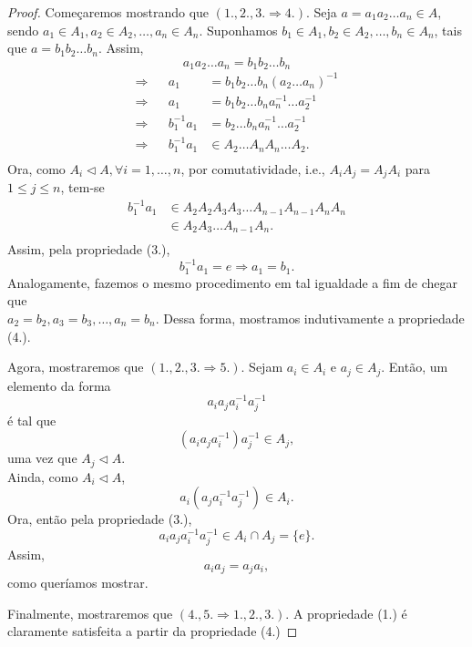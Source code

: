 \documentclass[11pt,openany]{book}
\begin{document}
\begin{proof}
    Começaremos mostrando que $(1., 2., 3. \Rightarrow 4.)$. Seja $a = a_1a_2\dots a_n \in A$, sendo $a_1 \in A_1, a_2 \in A_2, \dots, a_n \in A_n$. Suponhamos $b_1 \in A_1, b_2 \in A_2, \dots, b_n \in A_n$, tais que $a = b_1b_2\dots b_n$. Assim,
    \[a_1a_2\dots a_n = b_1b_2\dots b_n\]
    \begin{align*}
        \Rightarrow& & a_1 &= b_1b_2\dots b_n(a_2\dots a_n)^{-1}\\
        \Rightarrow& & a_1 &= b_1b_2\dots b_na_n^{-1}\dots a_2^{-1}\\
        \Rightarrow& & b_1^{-1}a_1 &= b_2\dots b_na_n^{-1}\dots a_2^{-1}\\
        \Rightarrow& & b_1^{-1}a_1 &\in A_2\dots A_nA_n\dots A_2.\\
    \end{align*}
    Ora, como $A_i \triangleleft A, \forall i = 1, \dots, n$, por comutatividade, i.e., $A_iA_j = A_jA_i$ para $1 \leq j \leq n$, tem-se
    \begin{align*}
        b_1^{-1}a_1 &\in A_2A_2A_3A_3\dots  A_{n-1}A_{n-1}A_nA_n\\
        &\in A_2A_3\dots  A_{n-1}A_n.\\
    \end{align*}
    Assim, pela propriedade (3.),
    \[b_1^{-1}a_1 = e \Rightarrow a_1 = b_1.\]
    Analogamente, fazemos o mesmo procedimento em tal igualdade a fim de chegar que\\ $a_2 = b_2, a_3 = b_3, \dots, a_n = b_n$. Dessa forma, mostramos indutivamente a propriedade (4.).

    Agora, mostraremos que $(1., 2., 3. \Rightarrow 5.)$. Sejam $a_i \in A_i$ e $a_j \in A_j$. Então, um elemento da forma
    \[a_ia_ja_i^{-1}a_j^{-1}\]
    é tal que
    \[(a_ia_ja_i^{-1})a_j^{-1} \in A_j,\]
    uma vez que $A_j \triangleleft A$.\\
    Ainda, como $A_i \triangleleft A$,
    \[a_i(a_ja_i^{-1}a_j^{-1}) \in A_i.\]
    Ora, então pela propriedade (3.),
    \[a_ia_ja_i^{-1}a_j^{-1} \in A_i \cap A_j = \{e\}.\]
    Assim,
    \[a_ia_j = a_ja_i,\]
    como queríamos mostrar.

        Finalmente, mostraremos que $(4., 5. \Rightarrow 1., 2., 3.)$. A propriedade (1.) é claramente satisfeita a partir da propriedade (4.)


\end{proof}
\end{document}
